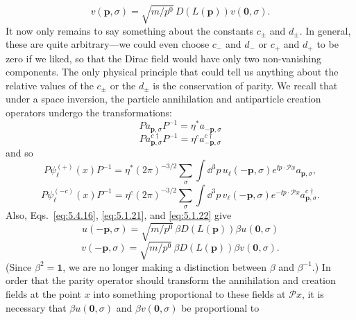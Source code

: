 \begin{equation}
v(\mathbf p,\sigma)=\sqrt{m/p^0}\,D(L(\mathbf p))v(\mathbf0,\sigma).
\tag{5.5.7}\label{eq:5.5.7}
\end{equation}
It now only remains to say something about the constants $c_\pm$ and $d_\pm$.
In general, these are quite arbitrary---we could even choose $c_-$ and $d_-$
or $c_+$ and $d_+$ to be zero if we liked, so that the Dirac field would have
only two non-vanishing components. The only physical principle that could tell
us anything about the relative values of the $c_\pm$ or the $d_\pm$ is the
conservation of parity. We recall that under a space inversion, the particle
annihilation and antiparticle creation operators undergo the transformations:
\begin{equation}
P a_{\mathbf p,\sigma}P^{-1}=\eta^*a_{-\mathbf p,\sigma}
\tag{5.5.8}\label{eq:5.5.8}
\end{equation}
\begin{equation}
P a^{c\dagger}_{\mathbf p,\sigma}P^{-1}
=\eta^c a^{c\dagger}_{-\mathbf p,\sigma}
\tag{5.5.9}\label{eq:5.5.9}
\end{equation}
and so
\begin{equation}
P\psi_\ell^{(+)}(x)P^{-1}=\eta^*(2\pi)^{-3/2}
\sum_\sigma\int \dd^3p\,u_\ell(-\mathbf p,\sigma)
e^{\ii p\cdot\mathcal P x}a_{\mathbf p,\sigma},
\tag{5.5.10}\label{eq:5.5.10}
\end{equation}
\begin{equation}
P\psi_\ell^{(-c)}(x)P^{-1}=\eta^c(2\pi)^{-3/2}
\sum_\sigma\int \dd^3p\,v_\ell(-\mathbf p,\sigma)
e^{-\ii p\cdot\mathcal P x}a^{c\dagger}_{\mathbf p,\sigma}.
\tag{5.5.11}\label{eq:5.5.11}
\end{equation}
Also, Eqs.~\eqref{eq:5.4.16}, \eqref{eq:5.1.21}, and \eqref{eq:5.1.22} give
\begin{equation}
u(-\mathbf p,\sigma)=\sqrt{m/p^0}\,\beta D(L(\mathbf p))\beta u(\mathbf0,\sigma)
\tag{5.5.12}\label{eq:5.5.12}
\end{equation}
\begin{equation}
v(-\mathbf p,\sigma)=\sqrt{m/p^0}\,\beta D(L(\mathbf p))\beta v(\mathbf0,\sigma).
\tag{5.5.13}\label{eq:5.5.13}
\end{equation}
(Since $\beta^2=\mathbf{1}$, we are no longer making a distinction between
$\beta$ and $\beta^{-1}$.) In order that the parity operator should transform
the annihilation and creation fields at the point $x$ into something
proportional to these fields at $\mathcal P x$, it is necessary that
$\beta u(\mathbf0,\sigma)$ and $\beta v(\mathbf0,\sigma)$ be proportional to
